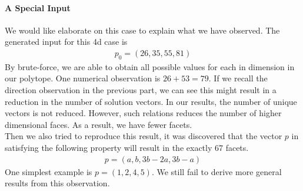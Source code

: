 \documentclass[12pt,letterpaper]{article}
\begin{document}
\paragraph{A Special Input}
We would like elaborate on this case to explain what we have observed.
The generated input for this 4d case is
\begin{align*}
    p_0 = (26, 35, 55, 81)
\end{align*}
By brute-force, we are able to obtain all possible values for each in dimension in 
our polytope. One numerical observation is $26+53 = 79$. If we recall 
the direction observation in the previous part, we can see this might result in 
a reduction in the number of solution vectors. In our results, the number of unique vectors is not reduced.
However, such relations reduces the number of higher dimensional faces. 
As a result, we have fewer facets.\\
Then we also tried to reproduce this result, it was discovered that the vector $p$ 
in satisfying the following property will result in the exactly 67 facets.
\begin{align*}
    p = (a, b, 3b - 2a, 3b - a)
\end{align*}
One simplest example is $p = (1, 2, 4, 5)$. 
We still fail to derive more general results from this observation.
\end{document}
